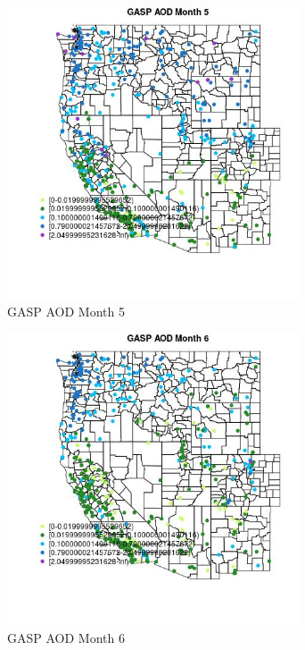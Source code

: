\begin{figure} 
\centering  
\includegraphics[width=0.77\textwidth]{Code_Outputs/Report_ML_input_PM25_Step4_part_e_de_duplicated_aves_compiled_2019-05-14wNAs_MapObsMo5GASP_AOD.jpg} 
\caption{\label{fig:Report_ML_input_PM25_Step4_part_e_de_duplicated_aves_compiled_2019-05-14wNAsMapObsMo5GASP_AOD}GASP AOD Month 5} 
\end{figure} 
 

\begin{figure} 
\centering  
\includegraphics[width=0.77\textwidth]{Code_Outputs/Report_ML_input_PM25_Step4_part_e_de_duplicated_aves_compiled_2019-05-14wNAs_MapObsMo6GASP_AOD.jpg} 
\caption{\label{fig:Report_ML_input_PM25_Step4_part_e_de_duplicated_aves_compiled_2019-05-14wNAsMapObsMo6GASP_AOD}GASP AOD Month 6} 
\end{figure} 
 

